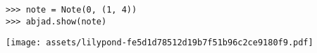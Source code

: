 \begin{comment}
<abjad>
note = Note(0, (1, 4))
abjad.show(note)
</abjad>
\end{comment}

\begin{lstlisting}
>>> note = Note(0, (1, 4))
>>> abjad.show(note)
\end{lstlisting}
\noindent\texttt{[image: assets/lilypond-fe5d1d78512d19b7f51b96c2ce9180f9.pdf]}

